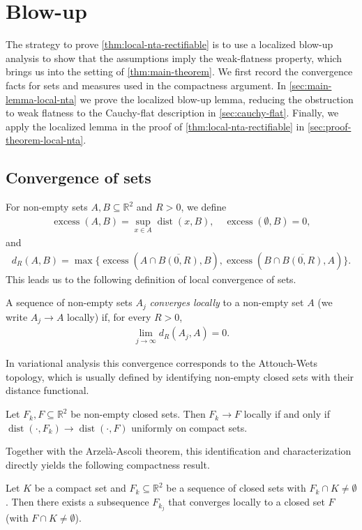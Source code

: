 \documentclass[11pt,a4paper,english,reqno]{amsart}
\numberwithin{equation}{section}
\newcommand{\RR}[0]{\mathbb{R}}
\renewcommand{\subset}{\subseteq}
\DeclareMathOperator{\dist}{dist}
\DeclareMathOperator{\excess}{excess}
\numberwithin{definition}{section}
\begin{document}
\section{Blow-up}\label{sec:blow-up}
The strategy to prove \cref{thm:local-nta-rectifiable} is to use a localized blow-up analysis to show that the assumptions imply the weak-flatness property, which brings us into the setting of \cref{thm:main-theorem}.
We first record the convergence facts for sets and measures used in the compactness argument.
In \cref{sec:main-lemma-local-nta} we prove the localized blow-up lemma, reducing the obstruction to weak flatness to the Cauchy-flat description in \cref{sec:cauchy-flat}.
Finally, we apply the localized lemma in the proof of \cref{thm:local-nta-rectifiable} in \cref{sec:proof-theorem-local-nta}.

\subsection{Convergence of sets}\label{sec:sets}
For non-empty sets $A,B\subset\RR^2$ and $R>0$, we define
\begin{align}
    \excess(A,B) = \sup_{x\in A} \dist(x,B), \quad \excess(\emptyset, B) = 0,
\end{align}
and
\begin{align}
    d_R(A,B) = \max\{ \excess(A \cap \overline{B(0,R)}, B),  \excess(B \cap \overline{B(0,R)}, A) \}.
\end{align}
This leads us to the following definition of local convergence of sets.
\begin{definition}
    A sequence of non-empty sets $A_j$ \emph{converges locally} to a non-empty set $A$ (we write $A_j\to A$ locally) if, for every $R>0$,
    \begin{align}
        \lim_{j\to ∞} d_R(A_j,A) = 0.
    \end{align}
\end{definition}
In variational analysis this convergence corresponds to the Attouch-Wets topology, which is usually defined by identifying non-empty closed sets with their distance functional.
\begin{lemma}\label{thm:convergence-of-dist-local}
    Let $F_k,F\subset\RR^2$ be non-empty closed sets.
    Then $F_k\to F$ locally if and only if
    $\dist(\cdot,F_k) \to \dist (\cdot,F)$ uniformly on compact sets.
\end{lemma}
Together with the Arzelà-Ascoli theorem, this identification and characterization directly yields the following compactness result.
\begin{lemma}\label{thm:local-conv-sequential-compactness}
    Let $K$ be a compact set and $F_k\subset\RR^2$ be a sequence of closed sets with $F_k\cap K\neq\emptyset$.
    Then there exists a subsequence $F_{k_j}$ that converges locally to a closed set $F$ (with $F\cap K\neq\emptyset$).
\end{lemma}
\end{document}
